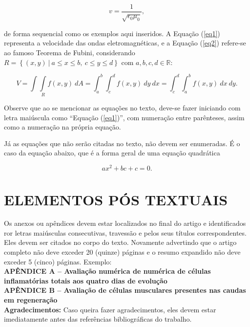 \documentclass{sep}
\begin{document}
\begin{equation} \label{eq1}
 v=\frac{1}{\sqrt{\epsilon_0\mu_0}},
\end{equation}

\noindent de forma sequencial como os exemplos aqui inseridos.
A Equação (\ref{eq1}) representa a velocidade das ondas eletromagnéticas, e a Equação (\ref{eq2}) refere-se ao famoso Teorema de Fubini, considerando $R=\left\{(x,y)~|~a\leq x\leq b,~c\leq y\leq d\right\}$ com $a,b,c,d\in\mathbb{R}$:

\begin{equation} \label{eq2}
 V=\int\int\limits_R f(x,y)~dA=\int_a^b\int_c^d f(x,y)~dy~dx=\int_c^d\int_a^b f(x,y)~dx~dy.
\end{equation}

Observe que ao se mencionar as equações no texto, deve-se fazer iniciando com letra maiúscula como ``Equação (\ref{eq1})'', com numeração entre parênteses, assim como a numeração na própria equação.

Já as equações que não serão citadas no texto, não devem ser enumeradas.
É o caso da equação abaixo, que é a forma geral de uma equação quadrática

$$ax^2+bc+c=0.$$

\section{ELEMENTOS PÓS TEXTUAIS}

Os anexos ou apêndices devem estar localizados no final do artigo e identificados ror letras maiúsculas consecutivas, travessão e pelos seus títulos correspondentes.
Eles devem ser citados no corpo do texto.
Novamente advertindo que o artigo completo não deve exceder 20 (quinze) páginas e o resumo expandido não deve exceder 5 (cinco) páginas.
Exemplo: \\

\noindent \textbf{APÊNDICE A -- Avaliação numérica de numérica de células inflamatórias totais aos quatro dias de evolução} \\

\noindent \textbf{APÊNDICE B -- Avaliação de células musculares presentes nas caudas em regeneração} \\

\noindent \textbf{Agradecimentos:} Caso queira fazer agradecimentos, eles devem estar imediatamente antes das referências bibliográficas do trabalho.


\end{document}
